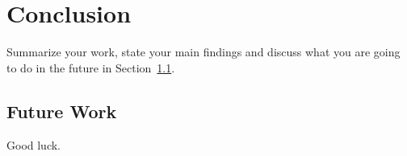 \chapter{Conclusion}
\label{cha:conc}

Summarize your work, state your main findings and discuss what you are
going to do in the future in Section~\ref{sec:future}.

\section{Future Work}
\label{sec:future}
Good luck.



